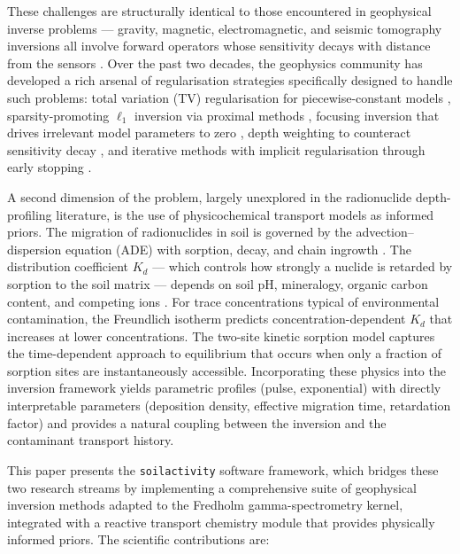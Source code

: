\documentclass[a4paper,11pt]{article}
\begin{document}
These challenges are structurally identical to those encountered in
geophysical inverse problems --- gravity, magnetic, electromagnetic, and
seismic tomography inversions all involve forward operators whose
sensitivity decays with distance from the sensors
\citep{zhdanov2002geophysical,li19963d,li19983d,priede2023linear}.
Over the past two decades, the geophysics community has developed a rich
arsenal of regularisation strategies specifically designed to handle such
problems: total variation (TV) regularisation for piecewise-constant
models \citep{vatankhah2018tv,molodtsov2021convex}, sparsity-promoting
\(\ell_1\) inversion via proximal methods \citep{beck2009fast,boyd2011distributed},
focusing inversion that drives irrelevant model parameters to zero
\citep{portniaguine1999focusing}, depth weighting to counteract sensitivity
decay \citep{li19963d,li19983d,astrakhantsev2021adaptive}, and iterative
methods with implicit regularisation through early stopping
\citep{chen2024adaptive,strohmer2009randomized}.

A second dimension of the problem, largely unexplored in the
radionuclide depth-profiling literature, is the use of physicochemical
transport models as informed priors.  The migration of radionuclides
in soil is governed by the advection--dispersion equation (ADE) with
sorption, decay, and chain ingrowth
\citep{iaea2010radiological,sheppard1990parameter}.  The distribution
coefficient $K_d$ --- which controls how strongly a nuclide is retarded
by sorption to the soil matrix --- depends on soil pH, mineralogy,
organic carbon content, and competing ions
\citep{sheppard1990parameter,roushdy2025sorption}.  For trace
concentrations typical of environmental contamination, the Freundlich
isotherm predicts concentration-dependent $K_d$ that increases at lower
concentrations.  The two-site kinetic sorption model
\citep{vangenuchten1989two,sperry2018two} captures the time-dependent
approach to equilibrium that occurs when only a fraction of sorption
sites are instantaneously accessible.  Incorporating these physics into
the inversion framework yields parametric profiles (pulse, exponential)
with directly interpretable parameters (deposition density, effective
migration time, retardation factor) and provides a natural coupling
between the inversion and the contaminant transport history.

This paper presents the \texttt{soilactivity} software framework, which
bridges these two research streams by implementing a comprehensive suite
of geophysical inversion methods adapted to the Fredholm gamma-spectrometry
kernel, integrated with a reactive transport chemistry module that
provides physically informed priors.  The scientific contributions are:
\end{document}

